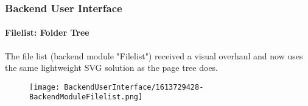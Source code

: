 %

\begin{frame}[fragile]
	\frametitle{Backend User Interface}
	\framesubtitle{Filelist: Folder Tree}

	The file list (backend module "Filelist") received a visual overhaul and now
	uses the same lightweight SVG solution as the page tree does.

	\begin{figure}
		\texttt{[image: BackendUserInterface/1613729428-BackendModuleFilelist.png]}
	\end{figure}

\end{frame}

